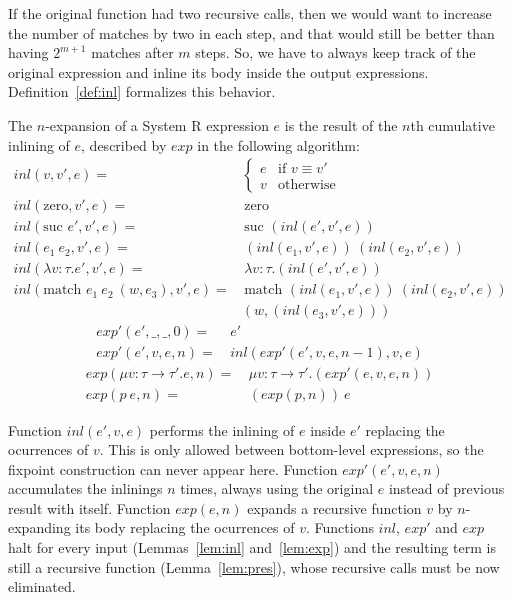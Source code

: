 \documentclass[runningheads]{llncs}
\begin{document}
\noindent If the original function
had two recursive calls, then we would want to increase 
the number of matches by two in each step, and that 
would still be better than having $2^{m+1}$ matches
after $m$ steps. 
So, we have to always keep track 
of the original expression and inline its body 
inside the output expressions. 
Definition~\ref{def:inl} formalizes this behavior.

\begin{definition}\label{def:inl}
The $n$-expansion of a System R expression $e$ is the 
result of the $n$th cumulative inlining of $e$, 
described by $exp$ in the following algorithm:
\begin{align*}
inl(v, v', e) =& \begin{cases}
  e & \text{if } v \equiv v'\\
  v & \text{otherwise}
\end{cases}\\
inl(\text{zero}, v', e) =& \, \text{zero}\\
inl(\text{suc }e', v', e) =& \, \text{suc }(inl(e', v', e))\\
inl(e_1 \: e_2, v', e) =& \, (inl(e_1, v', e)) \: (inl(e_2, v', e))\\
inl(\lambda v : \tau.e', v', e) =& \, \lambda v : \tau.(inl(e', v', e))\\
inl(\text{match }e_1 \: e_2 \: (w, e_3), v', e) =& \, \text{match }(inl(e_1, v', e)) \: (inl(e_2, v', e)) \\ & (w, (inl(e_3, v', e)))
\end{align*}
\begin{align*}
exp'(e', \_, \_, 0) =& \, e'\\
exp'(e', v, e, n) =& \, inl(exp'(e', v, e, n-1), v, e)
\end{align*}
\begin{align*}
exp(\mu v : \tau\rightarrow\tau'.e, n) =& \, \mu v : \tau\rightarrow\tau' . (exp'(e, v, e, n))\\
exp(p\:e, n) =& \, (exp(p, n)) \: e  
\end{align*}
\end{definition}

\noindent Function $inl(e', v, e)$ performs the inlining of 
$e$ inside $e'$ replacing the ocurrences of $v$. 
This is only allowed between bottom-level 
expressions, so the fixpoint construction can never 
appear here. Function $exp'(e', v, e, n)$ 
accumulates the inlinings $n$ times, always using 
the original $e$ instead of previous result with 
itself. Function $exp(e, n)$ expands a recursive 
function $v$ by $n$-expanding its body replacing 
the ocurrences of $v$. Functions $inl$, $exp'$ and $exp$ 
halt for every input (Lemmas~\ref{lem:inl} and~\ref{lem:exp}) and the resulting term is 
still a recursive function (Lemma~\ref{lem:pres}), 
whose recursive calls 
must be now eliminated. 
\end{document}
